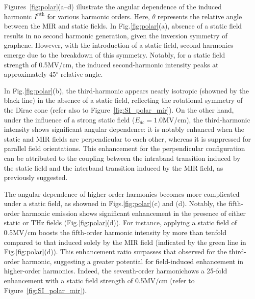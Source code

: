 Figures~\ref{fig:polar}(a--d) illustrate the angular dependence of the induced harmonic  $I^{n \textrm{th}}$ for various harmonic orders. Here, $\theta$ represents the relative angle between the MIR and static fields. In Fig.\ref{fig:polar}(a), absence of a static field results in no second harmonic generation, given the inversion symmetry of graphene. However, with the introduction of a static field, second harmonics emerge due to the breakdown of this symmetry. Notably, for a static field strength of 0.5MV/cm, the induced second-harmonic intensity peaks at approximately 45$^{\circ}$ relative angle.

In Fig.\ref{fig:polar}(b), the third-harmonic  appears nearly isotropic (showned by the black
line) in the absence of a static field, reflecting the rotational symmetry of the Dirac cone (refer
also to Figure~\ref{fig:SI_polar_mir}). On the other hand, under the influence of a strong static field ($E_{dc}=1.0$MV/cm), the third-harmonic intensity shows significant angular dependence: it is notably enhanced when the static and MIR fields are perpendicular to each other, whereas it is suppressed for parallel field orientations. This enhancement for the perpendicular configuration can be attributed to the coupling between the intraband transition induced by the static field and the interband transition induced by the MIR field, as previously suggested\cite{PhysRevB.103.L041408}.

The angular dependence of higher-order harmonics becomes more complicated under a static field, as
showned in Figs.\ref{fig:polar}(c) and (d). Notably, the fifth-order harmonic emission shows
significant enhancement in the presence of either static or THz fields (Fig.\ref{fig:polar}(d)).
For instance, applying a static field of 0.5MV/cm boosts the fifth-order harmonic intensity by more
than tenfold compared to that induced solely by the MIR field (indicated by the green line in
Fig.\ref{fig:polar}(d)). This enhancement ratio surpasses that observed for the third-order
harmonic, suggesting a greater potential for field-induced enhancement in higher-order harmonics.
Indeed, the seventh-order harmonichows a 25-fold enhancement with a static field strength of
0.5MV/cm (refer to Figure~\ref{fig:SI_polar_mir}).

